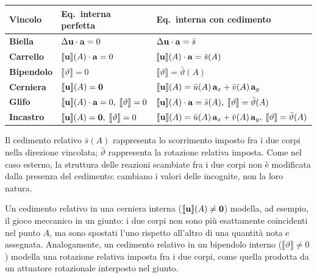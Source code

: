 \medskip

\begin{center}
	\renewcommand{\arraystretch}{1.6}
	\small
	\begin{tabular}{>{\bfseries}lll}
		\toprule
		Vincolo
		& Eq.\ interna perfetta
		& Eq.\ interna con cedimento\\
		\midrule
		Biella
		& $\Delta\mathbf{u}\cdot\mathbf{a} = 0$
		& $\Delta\mathbf{u}\cdot\mathbf{a} = \bar{s}$\\
		Carrello
		& $\llbracket\mathbf{u}\rrbracket(A)\cdot\mathbf{a} = 0$
		& $\llbracket\mathbf{u}\rrbracket(A)\cdot\mathbf{a} = \bar{s}(A)$\\
		Bipendolo
		& $\llbracket\vartheta\rrbracket = 0$
		& $\llbracket\vartheta\rrbracket = \bar{\vartheta}(A)$\\
		Cerniera
		& $\llbracket\mathbf{u}\rrbracket(A) = \mathbf{0}$
		& $\llbracket\mathbf{u}\rrbracket(A) = \bar{u}(A)\,\mathbf{a}_x
		+ \bar{v}(A)\,\mathbf{a}_y$\\
		Glifo
		& $\llbracket\mathbf{u}\rrbracket(A)\cdot\mathbf{a} = 0,\;
		\llbracket\vartheta\rrbracket = 0$
		& $\llbracket\mathbf{u}\rrbracket(A)\cdot\mathbf{a} = \bar{s}(A),\;
		\llbracket\vartheta\rrbracket = \bar{\vartheta}(A)$\\
		Incastro
		& $\llbracket\mathbf{u}\rrbracket(A) = \mathbf{0},\;
		\llbracket\vartheta\rrbracket = 0$
		& $\llbracket\mathbf{u}\rrbracket(A) = \bar{u}(A)\,\mathbf{a}_x
		+ \bar{v}(A)\,\mathbf{a}_y,\;
		\llbracket\vartheta\rrbracket = \bar{\vartheta}(A)$\\
		\bottomrule
	\end{tabular}
\end{center}


\medskip

\noindent
Il cedimento relativo $\bar{s}(A)$ rappresenta lo
scorrimento imposto fra i due corpi nella direzione
vincolata; $\bar{\vartheta}$ rappresenta la rotazione
relativa imposta. Come nel caso esterno, la struttura
delle reazioni scambiate fra i due corpi non è
modificata dalla presenza del cedimento: cambiano i
valori delle incognite, non la loro natura.

\begin{oss}
	Un cedimento relativo in una cerniera interna
	($\llbracket\mathbf{u}\rrbracket(A) \neq \mathbf{0}$) modella, ad esempio,
	il gioco meccanico in un giunto: i due corpi non
	sono più esattamente coincidenti nel punto $A$, ma
	sono spostati l'uno rispetto all'altro di una
	quantità nota e assegnata. Analogamente, un cedimento
	relativo in un bipendolo interno
	($\llbracket\vartheta\rrbracket \neq 0$) modella una rotazione
	relativa imposta fra i due corpi, come quella
	prodotta da un attuatore rotazionale interposto nel
	giunto.
\end{oss}

